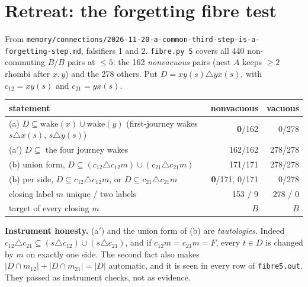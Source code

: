 \documentclass[11pt]{article}
\theoremstyle{definition}\newtheorem{definition}[theorem]{Definition}\newtheorem{remark}[theorem]{Remark}
\begin{document}
\section{Retreat: the forgetting fibre test}\label{sec:fibre}
From \texttt{memory/connections/2026-11-20-a-common-third-step-is-a-forgetting-step.md}, falsifiers 1 and 2. \texttt{fibre.py 5} covers all 440 non-commuting $B/B$ pairs at $\le5$: the 162 \emph{nonvacuous} pairs (nest $A$ keeps $\ge2$ rhombi after $x,y$) and the 278 others. Put $D=xy(s)\triangle yx(s)$, with $c_{12}=xy(s)$ and $c_{21}=yx(s)$.
\begin{center}\begin{tabular}{lrr}\toprule
statement & nonvacuous & vacuous\\\midrule
(a) $D\subseteq\mathrm{wake}(x)\cup\mathrm{wake}(y)$ (first-journey wakes $s\triangle x(s)$, $s\triangle y(s)$) & \textbf{0}/162 & 0/278\\
(a$'$) $D\subseteq$ the four journey wakes & 162/162 & 278/278\\
(b) union form, $D\subseteq(c_{12}\triangle c_{12}m)\cup(c_{21}\triangle c_{21}m)$ & 171/171 & 278/278\\
(b) per side, $D\subseteq c_{12}\triangle c_{12}m$, or $D\subseteq c_{21}\triangle c_{21}m$ & \textbf{0}/171, 0/171 & 0/278\\
closing label $m$ unique / two labels & 153 / 9 & 278 / 0\\
target of every closing $m$ & $B$ & $B$\\\bottomrule
\end{tabular}\end{center}
\textbf{Instrument honesty.} (a$'$) and the union form of (b) are \emph{tautologies}. Indeed $c_{12}\triangle c_{21}\subseteq(s\triangle c_{12})\cup(s\triangle c_{21})$, and if $c_{12}m=c_{21}m=F$, every $t\in D$ is changed by $m$ on exactly one side. The second fact also makes $|D\cap m_{12}|+|D\cap m_{21}|=|D|$ automatic, and it is seen in every row of \texttt{fibre5.out}. They passed as instrument checks, not as evidence.
\end{document}
